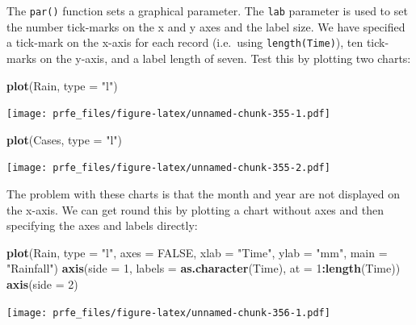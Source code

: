 \documentclass[12pt,a4paper]{book}
\newenvironment{Shaded}{\begin{snugshade}}{\end{snugshade}}
\newcommand{\DataTypeTok}[1]{\textcolor[rgb]{0.13,0.29,0.53}{#1}}
\newcommand{\DecValTok}[1]{\textcolor[rgb]{0.00,0.00,0.81}{#1}}
\newcommand{\KeywordTok}[1]{\textcolor[rgb]{0.13,0.29,0.53}{\textbf{#1}}}
\newcommand{\NormalTok}[1]{#1}
\newcommand{\OperatorTok}[1]{\textcolor[rgb]{0.81,0.36,0.00}{\textbf{#1}}}
\newcommand{\OtherTok}[1]{\textcolor[rgb]{0.56,0.35,0.01}{#1}}
\newcommand{\StringTok}[1]{\textcolor[rgb]{0.31,0.60,0.02}{#1}}
\theoremstyle{definition}
\theoremstyle{definition}
\theoremstyle{definition}
\theoremstyle{remark}
\begin{document}
The \texttt{par()} function sets a graphical parameter. The \texttt{lab}
parameter is used to set the number tick-marks on the x and y axes and
the label size. We have specified a tick-mark on the x-axis for each
record (i.e.~using \texttt{length(Time)}), ten tick-marks on the y-axis,
and a label length of seven. Test this by plotting two charts:

\begin{Shaded}
\begin{Highlighting}[]
\KeywordTok{plot}\NormalTok{(Rain, }\DataTypeTok{type =} \StringTok{"l"}\NormalTok{)}
\end{Highlighting}
\end{Shaded}

\texttt{[image: prfe\_files/figure-latex/unnamed-chunk-355-1.pdf]}

\begin{Shaded}
\begin{Highlighting}[]
\KeywordTok{plot}\NormalTok{(Cases, }\DataTypeTok{type =} \StringTok{"l"}\NormalTok{)}
\end{Highlighting}
\end{Shaded}

\texttt{[image: prfe\_files/figure-latex/unnamed-chunk-355-2.pdf]}

The problem with these charts is that the month and year are not
displayed on the x-axis. We can get round this by plotting a chart
without axes and then specifying the axes and labels directly:

\begin{Shaded}
\begin{Highlighting}[]
\KeywordTok{plot}\NormalTok{(Rain, }\DataTypeTok{type =} \StringTok{"l"}\NormalTok{, }\DataTypeTok{axes =} \OtherTok{FALSE}\NormalTok{, }\DataTypeTok{xlab =} \StringTok{"Time"}\NormalTok{, }\DataTypeTok{ylab =} \StringTok{"mm"}\NormalTok{, }\DataTypeTok{main =} \StringTok{"Rainfall"}\NormalTok{)}
\KeywordTok{axis}\NormalTok{(}\DataTypeTok{side =} \DecValTok{1}\NormalTok{, }\DataTypeTok{labels =} \KeywordTok{as.character}\NormalTok{(Time), }\DataTypeTok{at =} \DecValTok{1}\OperatorTok{:}\KeywordTok{length}\NormalTok{(Time))}
\KeywordTok{axis}\NormalTok{(}\DataTypeTok{side =} \DecValTok{2}\NormalTok{)}
\end{Highlighting}
\end{Shaded}

\texttt{[image: prfe\_files/figure-latex/unnamed-chunk-356-1.pdf]}
\end{document}
